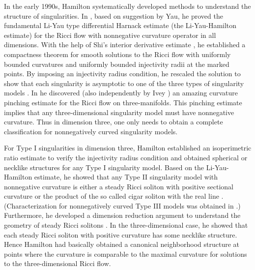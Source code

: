 In the early 1990s, Hamilton systematically developed methods to
understand the structure of singularities. In \cite{Ha93}, based
on suggestion by Yau, he proved the fundamental Li-Yau \cite{LY}
type differential Harnack estimate (the Li-Yau-Hamilton estimate)
for the Ricci flow with nonnegative curvature operator in all
dimensions. With the help of Shi's interior derivative estimate
\cite{Sh89}, he \cite{Ha95} established a compactness theorem for
smooth solutions to the Ricci flow with uniformly bounded
curvatures and uniformly bounded injectivity radii at the marked
points. By imposing an injectivity radius condition, he rescaled
the solution to show that each singularity is asymptotic to one of
the three types of singularity models \cite{Ha95F}. In \cite
{Ha95F} he discovered (also independently by Ivey \cite{Iv}) an
amazing curvature pinching estimate for the Ricci flow on
three-manifolds. This pinching estimate implies that any
three-dimensional singularity model must have nonnegative
curvature. Thus in dimension three, one only needs to obtain a
complete classification for nonnegatively curved singularity
models.

For Type I singularities in dimension three, Hamilton \cite{Ha95F}
established an isoperimetric ratio estimate to verify the
injectivity radius condition and obtained spherical or necklike
structures for any Type I singularity model. Based on the
Li-Yau-Hamilton estimate, he showed that any Type II singularity
model with nonnegative curvature is either a steady Ricci soliton
with positive sectional curvature or the product of the so called
cigar soliton with the real line \cite{Ha93E}. (Characterization
for nonnegatively curved Type III models was obtained in
\cite{CZ00}.) Furthermore, he developed a dimension reduction
argument to understand the geometry of steady Ricci solitons
\cite{Ha95F}. In the three-dimensional case, he showed that each
steady Ricci soliton with positive curvature has some necklike
structure. Hence Hamilton had basically obtained a canonical
neighborhood structure at points where the curvature is comparable
to the maximal curvature for solutions to the three-dimensional
Ricci flow.


